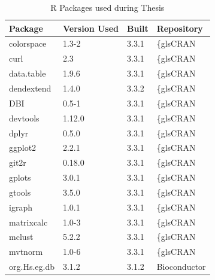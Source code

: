\begin{longtable}{llll}
\caption{R Packages used during Thesis}
\label{tab:computers_r_packages}
\\
\multicolumn{1}{l}{\bfseries Package}      & \multicolumn{1}{l}{\bfseries Version Used} & \multicolumn{1}{l}{\bfseries Built} & \multicolumn{1}{l}{\bfseries Repository}      \\
\hline  \rowcolor{black!10}
colorspace   & 1.3-2          & 3.3.1 & \{gls{CRAN}            \\
\rowcolor{black!5}
curl         & 2.3            & 3.3.1 & \{gls{CRAN}            \\
\rowcolor{black!10}
data.table   & 1.9.6          & 3.3.1 & \{gls{CRAN}            \\
\rowcolor{black!5}
dendextend   & 1.4.0          & 3.3.2 & \{gls{CRAN}            \\
\rowcolor{black!10}
DBI          & 0.5-1          & 3.3.1 & \{gls{CRAN}            \\
\rowcolor{black!5}
devtools     & 1.12.0         & 3.3.1 & \{gls{CRAN}            \\
\rowcolor{black!10}
dplyr        & 0.5.0          & 3.3.1 & \{gls{CRAN}            \\
\rowcolor{black!5}
ggplot2      & 2.2.1          & 3.3.1 & \{gls{CRAN}            \\
\rowcolor{black!10}
git2r        & 0.18.0         & 3.3.1 & \{gls{CRAN}            \\
\rowcolor{black!5}
gplots       & 3.0.1          & 3.3.1 & \{gls{CRAN}            \\
\rowcolor{black!10}
gtools       & 3.5.0          & 3.3.1 & \{gls{CRAN}            \\
\rowcolor{black!5}
igraph       & 1.0.1          & 3.3.1 & \{gls{CRAN}            \\
\rowcolor{black!10}
matrixcalc   & 1.0-3          & 3.3.1 & \{gls{CRAN}            \\
\rowcolor{black!5}
mclust       & 5.2.2          & 3.3.1 & \{gls{CRAN}            \\
\rowcolor{black!10}
mvtnorm      & 1.0-6          & 3.3.1 & \{gls{CRAN}            \\
\rowcolor{black!5}
org.Hs.eg.db & 3.1.2          & 3.1.2 & Bioconductor    \\

\end{longtable}
